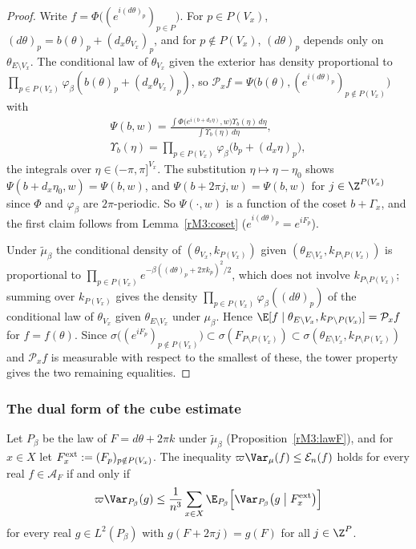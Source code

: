 \begin{proof}
Write $f=\Phi\bigl((e^{i(d\theta)_p})_{p\in P}\bigr)$. For $p\in P(V_x)$,
$(d\theta)_p=b(\theta)_p+(d_x\theta_{V_x})_p$, and for $p\notin P(V_x)$,
$(d\theta)_p$ depends only on $\theta_{E\setminus V_x}$. The conditional
law of $\theta_{V_x}$ given the exterior has density proportional to
$\prod_{p\in P(V_x)}\varphi_\beta(b(\theta)_p+(d_x\theta_{V_x})_p)$, so
$\mathcal P_xf=\Psi\bigl(b(\theta),(e^{i(d\theta)_p})_{p\notin P(V_x)}\bigr)$
with
\begin{gather*}
\Psi(b,w)=\frac{\int\Phi\bigl(e^{i(b+d_x\eta)},w\bigr)\Upsilon_b(\eta)\,d\eta}
{\int\Upsilon_b(\eta)\,d\eta},\\
\Upsilon_b(\eta)=\prod_{p\in P(V_x)}\varphi_\beta\bigl(b_p+(d_x\eta)_p\bigr),
\end{gather*}
the integrals over $\eta\in(-\pi,\pi]^{V_x}$.
The substitution $\eta\mapsto\eta-\eta_0$ shows $\Psi(b+d_x\eta_0,w)=
\Psi(b,w)$, and $\Psi(b+2\pi j,w)=\Psi(b,w)$ for $j\in\Z^{P(V_x)}$ since
$\Phi$ and $\varphi_\beta$ are $2\pi$-periodic. So $\Psi(\cdot,w)$ is a
function of the coset $b+\Gamma_x$, and the first claim follows from
Lemma~\ref{rM3:coset} ($e^{i(d\theta)_p}=e^{iF_p}$).

Under $\tilde\mu_\beta$ the conditional density of $(\theta_{V_x},k_{P(V_x)})$
given $(\theta_{E\setminus V_x},k_{P\setminus P(V_x)})$ is proportional to
$\prod_{p\in P(V_x)}e^{-\beta((d\theta)_p+2\pi k_p)^2/2}$, which does not
involve $k_{P\setminus P(V_x)}$; summing over $k_{P(V_x)}$ gives the density
$\prod_{p\in P(V_x)}\varphi_\beta((d\theta)_p)$ of the conditional law of
$\theta_{V_x}$ given $\theta_{E\setminus V_x}$ under $\mu_\beta$. Hence $\E[f\mid\theta_{E\setminus V_x},k_{P\setminus P(V_x)}]=
\mathcal P_xf$ for $f=f(\theta)$. Since $\sigma\bigl((e^{iF_p})_{p\notin
P(V_x)}\bigr)\subset\sigma(F_{P\setminus P(V_x)})\subset\sigma(\theta_{E
\setminus V_x},k_{P\setminus P(V_x)})$ and $\mathcal P_xf$ is measurable
with respect to the smallest of these, the tower property gives the two
remaining equalities.
\end{proof}

\subsubsection{The dual form of the cube estimate}\label{rM3:dualsec}

\begin{theorem}\label{rM3:dualform}
Let $P_\beta$ be the law of $F=d\theta+2\pi k$ under $\tilde\mu_\beta$
(Proposition~\ref{rM3:lawF}), and for $x\in X$ let $F_x^{\rm ext}:=
(F_p)_{p\notin P(V_x)}$. The inequality $\varpi\Var_\mu(f)\le\mathcal E_n
(f)$ holds for every real $f\in\mathcal A_F$ if and only if
\[
\varpi\Var_{P_\beta}(g)\le\frac1{n^3}\sum_{x\in X}\E_{P_\beta}\Bigl[\Var_{P_
\beta}\bigl(g\bigm|F_x^{\rm ext}\bigr)\Bigr]
\]
for every real $g\in L^2(P_\beta)$ with $g(F+2\pi j)=g(F)$ for all
$j\in\Z^P$.
\end{theorem}

